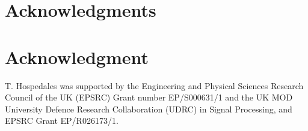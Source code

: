 \documentclass[10pt,journal,compsoc]{IEEEtran}
\begin{document}


\ifCLASSOPTIONcompsoc
 \section*{Acknowledgments}
\else
 \section*{Acknowledgment}
\fi


T. Hospedales was supported by the Engineering and Physical Sciences Research Council of the UK (EPSRC) Grant number EP/S000631/1 and the UK MOD University Defence Research Collaboration (UDRC) in Signal Processing, and EPSRC Grant EP/R026173/1.


\ifCLASSOPTIONcaptionsoff
 \newpage
\fi





%
%
%
\end{document}
